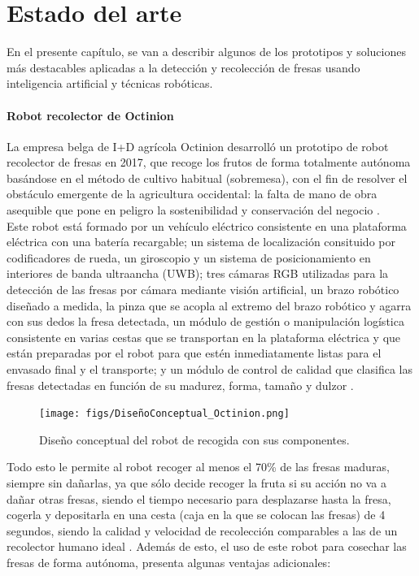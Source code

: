 \chapter{Estado del arte}
\label{cap:capitulo2}
	
En el presente capítulo, se van a describir algunos de los prototipos y soluciones más destacables aplicadas a la detección y recolección de fresas usando inteligencia artificial y técnicas robóticas.

\subsubsection{Robot recolector de Octinion}
La empresa belga de I+D agrícola Octinion desarrolló un prototipo de robot recolector de fresas en 2017, que recoge los frutos de forma totalmente autónoma basándose en el método de cultivo habitual (sobremesa), con el fin de resolver el obstáculo emergente de la agricultura occidental: la falta de mano de obra asequible que pone en peligro la sostenibilidad y conservación del negocio \cite{DePreter18}.\\

Este robot está formado por un vehículo eléctrico consistente en una plataforma eléctrica con una batería recargable; un sistema de localización consituido por codificadores de rueda, un giroscopio y un sistema de posicionamiento en interiores de banda ultraancha (UWB); tres cámaras RGB utilizadas para la detección de las fresas por cámara mediante visión artificial, un brazo robótico diseñado a medida, la pinza que se acopla al extremo del brazo robótico y agarra con sus dedos la fresa detectada, un módulo de gestión o manipulación logística consistente en varias cestas que se transportan en la plataforma eléctrica y que están preparadas por el robot para que estén inmediatamente listas para el envasado final y el transporte; y un módulo de control de calidad que clasifica las fresas detectadas en función de su madurez, forma, tamaño y dulzor \cite{DePreter18}.

\begin{figure} [h!]
    \begin{center}
      \texttt{[image: figs/DiseñoConceptual\_Octinion.png]}
    \end{center}
    \caption{Diseño conceptual del robot de recogida con sus componentes.}
    \label{fig:DiseñoConceptual_Octinion}
\end{figure}
\pagebreak


Todo esto le permite al robot recoger al menos el 70\% de las fresas maduras, siempre sin dañarlas, ya que sólo decide recoger la fruta si su acción no va a dañar otras fresas, siendo el tiempo necesario para desplazarse hasta la fresa, cogerla y depositarla en una cesta (caja en la que se colocan las
fresas) de 4 segundos, siendo la calidad y velocidad de recolección comparables a las de un recolector humano ideal \cite{DePreter18}. Además de esto, el uso de este robot para cosechar las fresas de forma autónoma, presenta algunas ventajas adicionales:

